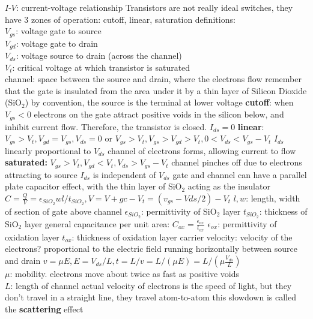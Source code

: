 \documentclass[12pt]{article}
\begin{document}
\begin{spacing}{0.8}
\begin{multicols*}{2}
\begin{flushleft}
\begin{outline}[longenum]
  \1 $I$-$V$: current-voltage relationship
  \1 Transistors are not really ideal switches, they have 3 zones of operation: cutoff, linear, saturation
  \1 definitions:
    \\ $V_{gs}$: voltage gate to source
    \\ $V_{gd}$: voltage gate to drain
    \\ $V_{ds}$: voltage source to drain (across the channel)
    \\ $V_t$: critical voltage at which transistor is saturated
    \\ channel: space between the source and drain, where the electrons flow
  \1 remember that the gate is insulated from the area under it by a thin layer of Silicon Dioxide (SiO$_2$)
  \1 by convention, the source is the terminal at lower voltage
  \1 \textbf{cutoff}:
    \2 when $V_{gs}<0$
    \2 electrons on the gate attract positive voids in the silicon below, and inhibit current flow. Therefore, the transistor is closed.
    \2 $I_{ds}=0$
  \1 \textbf{linear}:
    \2 $V_{gs}>V_t, V_{gd}=V_{gs}, V_{ds}=0$
    or $V_{gs}>V_t, V_{gs}>V_{gd}>V_t, 0<V_{ds}<V_{gs}-V_t$
    \2 $I_{ds}$ linearly proportional to $V_{ds}$
    \2 channel of electrons forms, allowing current to flow
  \1 \textbf{saturated:}
    \2 $V_{gs}>V_t, V_{gd}<V_t, V_{ds}>V_{gs}-V_t$
    \2 channel pinches off due to electrons attracting to source
    \2 $I_{ds}$ is independent of $V_{ds}$
  \1 gate and channel can have a parallel plate capacitor effect, with the thin layer of SiO$_2$ acting as the insulator
  \1 $C=\frac{Q}{V}=\epsilon_{SiO_2}wl/t_{SiO_2}, V = V+{gc}-V_t=(v_{gs}-V{ds}/2)-V_t$
    \2 $l,w$: length, width of section of gate above channel
    \2 $\epsilon_{SiO_2}$: permittivity of SiO$_2$ layer
    \2 $t_{SiO_2}$: thickness of SiO$_2$ layer
  \1 general capacitance per unit area: $C_{ox}=\frac{\epsilon_{ox}}{t_{ox}}$
    \2 $\epsilon_{ox}$: permittivity of oxidation layer
    \2 $t_{ox}$: thickness of oxidation layer
  \1 carrier velocity: velocity of the electrons?
    \2 proportional to the electric field running horizontally between source and drain
    \2 $v=\mu E, E=V_{ds}/L, t=L/v=L/(\mu E)=L/(\mu\frac{V_{ds}}{L})$
    \\ $\mu$: mobility. electrons move about twice as fast as positive voids
    \\ $L$: length of channel
  \1 actual velocity of electrons is the speed of light, but they don't travel in a straight line, they travel atom-to-atom
    \2 this slowdown is called the \textbf{scattering} effect

\end{outline}
\end{flushleft}
\end{multicols*}
\end{spacing}
\end{document}

